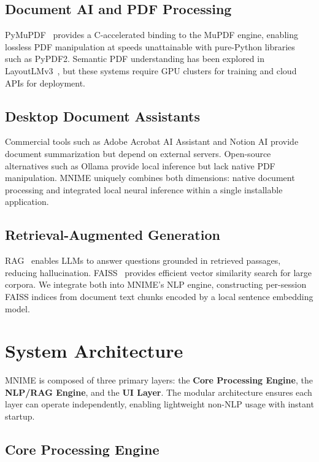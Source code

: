 \documentclass[11pt]{article}
\begin{document}
\subsection{Document AI and PDF Processing}

PyMuPDF~\cite{pymupdf2024} provides a C-accelerated binding to the MuPDF
engine, enabling lossless PDF manipulation at speeds unattainable with
pure-Python libraries such as PyPDF2.
Semantic PDF understanding has been explored in
LayoutLMv3~\cite{huang2022layoutlmv3}, but these systems require GPU clusters
for training and cloud APIs for deployment.

\subsection{Desktop Document Assistants}

Commercial tools such as Adobe Acrobat AI Assistant and Notion AI provide
document summarization but depend on external servers.
Open-source alternatives such as Ollama provide local inference but lack
native PDF manipulation.
MNIME uniquely combines both dimensions: native document processing and
integrated local neural inference within a single installable application.

\subsection{Retrieval-Augmented Generation}

RAG~\cite{lewis2020rag} enables LLMs to answer questions grounded in
retrieved passages, reducing hallucination.
FAISS~\cite{johnson2019faiss} provides efficient vector similarity search
for large corpora.
We integrate both into MNIME's NLP engine, constructing per-session FAISS
indices from document text chunks encoded by a local sentence embedding model.

\section{System Architecture}
\label{sec:system}

MNIME is composed of three primary layers: the \textbf{Core Processing
Engine}, the \textbf{NLP/RAG Engine}, and the \textbf{UI Layer}.
The modular architecture ensures each layer can operate independently,
enabling lightweight non-NLP usage with instant startup.

\subsection{Core Processing Engine}
\end{document}

